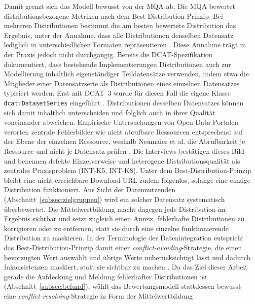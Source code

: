 Damit grenzt sich das Modell bewusst von der MQA ab. Die MQA bewertet distributionsbezogene Metriken nach dem Best-Distribution-Prinzip. Bei mehreren Distributionen bestimmt die am besten bewertete Distribution das Ergebnis, unter der Annahme, dass alle Distributionen denselben Datensatz lediglich in unterschiedlichen Formaten repräsentieren \cite{data_europa, piveauMetricsScore}.
Diese Annahme trägt in der Praxis jedoch nicht durchgängig. Bereits die DCAT-Spezifikation dokumentiert, dass bestehende Implementierungen Distributionen auch zur Modellierung inhaltlich eigenständiger Teildatensätze verwenden, indem etwa die Mitglieder einer Datensatzserie als Distributionen eines einzelnen Datensatzes typisiert werden. Erst mit DCAT~3 wurde für diesen Fall die eigene Klasse \texttt{dcat:DatasetSeries} eingeführt \cite[Abschnitt~12.3]{W3CDCAT3}. Distributionen desselben Datensatzes können sich damit inhaltlich unterscheiden und folglich auch in ihrer Qualität voneinander abweichen. Empirische Untersuchungen von Open-Data-Portalen verorten zentrale Fehlerbilder wie nicht abrufbare Ressourcen entsprechend auf der Ebene der einzelnen Ressource, weshalb Neumaier et al. die Abrufbarkeit je Ressource und nicht je Datensatz prüfen \cite{Neumaier2016MetadataQuality}. Die Interviews bestätigen dieses Bild und benennen defekte Einzelverweise und heterogene Distributionsqualität als zentrales Praxisproblem (INT-K5, INT-K8). %
Unter dem Best-Distribution-Prinzip bleibt eine nicht erreichbare Download-URL zudem folgenlos, solange eine einzige Distribution funktioniert. Aus Sicht der Datennutzenden (Abschnitt~\ref{subsec:zielgruppen}) wird ein solcher Datensatz systematisch überbewertet. Die Mittelwertbildung macht dagegen jede Distribution im Ergebnis sichtbar und setzt zugleich einen Anreiz, fehlerhafte Distributionen zu korrigieren oder zu entfernen, statt sie durch eine einzelne funktionierende Distribution zu maskieren. In der Terminologie der Datenintegration entspricht das Best-Distribution-Prinzip damit einer \textit{conflict-avoiding}-Strategie, die einen bevorzugten Wert auswählt und übrige Werte unberücksichtigt lässt und dadurch Inkonsistenzen maskiert, statt sie sichtbar zu machen \cite{BleiholderNaumann2008}. Da das Ziel dieser Arbeit gerade die Aufdeckung und Meldung fehlerhafter Distributionen ist (Abschnitt~\ref{subsec:befund}), wählt das Bewertungsmodell stattdessen bewusst eine \textit{conflict-resolving}-Strategie in Form der Mittelwertbildung \cite{BleiholderNaumann2008}.

